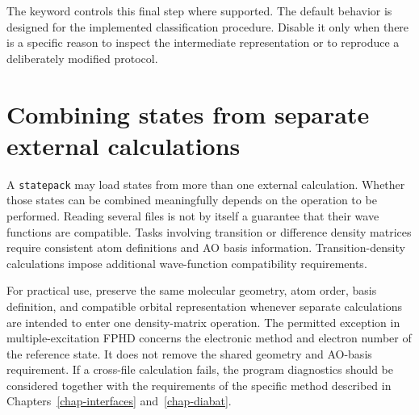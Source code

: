 The  keyword controls this final step where supported. The default behavior is designed for the implemented classification procedure. Disable it only when there is a specific reason to inspect the intermediate representation or to reproduce a deliberately modified protocol.

\section{Combining states from separate external calculations}
A \texttt{statepack} may load states from more than one external calculation. Whether those states can be combined meaningfully depends on the operation to be performed. Reading several files is not by itself a guarantee that their wave functions are compatible. Tasks involving transition or difference density matrices require consistent atom definitions and AO basis information. Transition-density calculations impose additional wave-function compatibility requirements.

For practical use, preserve the same molecular geometry, atom order, basis definition, and compatible orbital representation whenever separate calculations are intended to enter one density-matrix operation. The permitted exception in multiple-excitation FPHD concerns the electronic method and electron number of the reference state. It does not remove the shared geometry and AO-basis requirement. If a cross-file calculation fails, the program diagnostics should be considered together with the requirements of the specific method described in Chapters~\ref{chap-interfaces} and~\ref{chap-diabat}.
